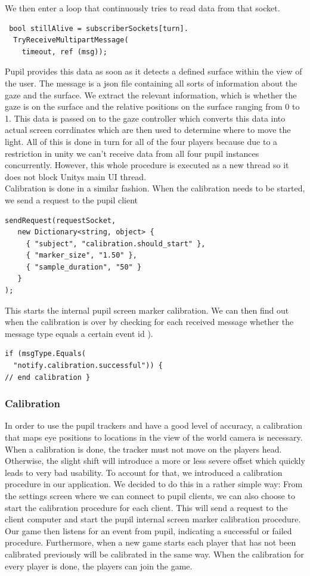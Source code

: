 \documentclass{sigchi}
\begin{document}
We then enter a loop that continuously tries to read data from that socket.
 \begin{verbatim}
 bool stillAlive = subscriberSockets[turn].
  TryReceiveMultipartMessage(
    timeout, ref (msg));
\end{verbatim}

  Pupil provides this data as soon as it detects a defined surface within the view of the user. The message is a json file containing all sorts of information about the gaze and the surface. We extract the relevant information, which is whether the gaze is on the surface and the relative positions on the surface ranging from 0 to 1. This data is passed on to the gaze controller which converts this data into actual screen corrdinates which are then used to determine where to move the light. All of this is done in turn for all of the four players because due to a restriction in unity we can't receive data from all four pupil instances concurrently. However, this whole procedure is executed as a new thread so it does not block Unitys main UI thread.\\
Calibration is done in a similar fashion. When the calibration needs to be started, we send a request to the pupil client 
 \begin{verbatim}
sendRequest(requestSocket,
   new Dictionary<string, object> { 
     { "subject", "calibration.should_start" }, 
     { "marker_size", "1.50" }, 
     { "sample_duration", "50" } 
   }
);
\end{verbatim}

This starts the internal pupil screen marker calibration. We can then find out when the calibration is over by checking for each received message whether the message type equals a certain event id ).
 \begin{verbatim}
if (msgType.Equals(
  "notify.calibration.successful")) {
// end calibration }
\end{verbatim}

\subsubsection{Calibration}
In order to use the pupil trackers and have a good level of accuracy, a calibration that maps eye positions to locations in the view of the world camera is necessary. When a calibration is done, the tracker must not move on the players head. Otherwise, the slight shift will introduce a more or less severe offset which quickly leads to very bad usability. To account for that, we introduced a calibration procedure in our application. We decided to do this in a rather simple way: From the settings screen where we can connect to pupil clients, we can also choose to start the calibration procedure for each client. This will send a request to the client computer and start the pupil internal screen marker calibration procedure. Our game then listens for an event from pupil, indicating a successful or failed procedure. Furthermore, when a new game starts each player that has not been calibrated previously will be calibrated in the same way. When the calibration for every player is done, the players can join the game.
\end{document}
